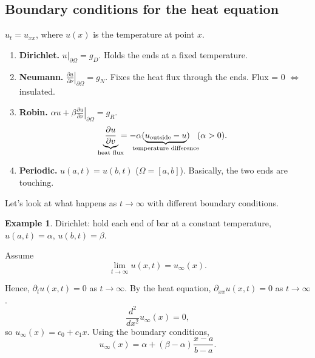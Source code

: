 \documentclass[12pt]{article}
\theoremstyle{definition}
\newtheorem*{example*}{Example}
\begin{document}
\subsection{Boundary conditions for the heat equation}
$u_t=u_{xx}$, where $u(x)$ is the temperature at point $x$.

\begin{enumerate}[label=(\alph*)]
\item\label{Dirichlet} \textbf{Dirichlet.} $u|_{\partial\Omega}=g_D$. Holds the ends at a fixed temperature.

\item\label{Neumann} \textbf{Neumann.} $\left.\frac{\partial u}{\partial\nu}\right|_{\partial\Omega}=g_N$. Fixes the heat flux through the ends. Flux = 0 $\Leftrightarrow$ insulated.

\item \textbf{Robin.} $\alpha u+\beta\left.\frac{\partial u}{\partial\nu}\right|_{\partial\Omega}=g_R$.
\[\underbrace{\frac{\partial u}{\partial v}}_{\mathclap{\text{heat flux}}}=-\alpha(\underbrace{u_\text{outside}-u}_{\mathclap{\text{temperature difference}}})\hspace{3mm}(\alpha>0).\]

\item \textbf{Periodic.} $u(a,t)=u(b,t)$ ($\Omega=[a,b]$). Basically, the two ends are touching.
\end{enumerate}

Let's look at what happens as $t\to\infty$ with different boundary conditions.

\begin{example*}
Dirichlet: hold each end of bar at a constant temperature, $u(a,t)=\alpha$, $u(b,t)=\beta$.

Assume
\[\lim_{t\to\infty}u(x,t)=u_\infty(x).\]

Hence, $\partial_tu(x,t)=0$ as $t\to\infty$. By the heat equation, $\partial_{xx}u(x,t)=0$ as $t\to\infty$.
\[\frac{d^2}{dx^2}u_\infty(x)=0,\]
so $u_\infty(x)=c_0+c_1x$. Using the boundary conditions,
\[u_\infty(x)=\alpha+(\beta-\alpha)\frac{x-a}{b-a}.\]
\end{example*}
\end{document}

